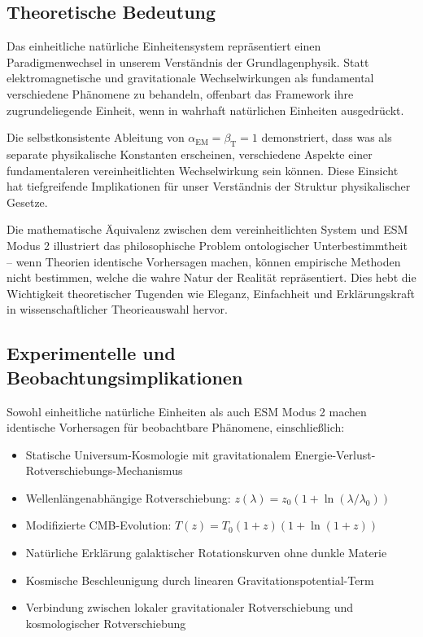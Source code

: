 \documentclass[12pt,a4paper]{article}
\newcommand{\alphaEM}{\alpha_{\text{EM}}}
\newcommand{\betaT}{\beta_{\text{T}}}
\begin{document}
	\subsection{Theoretische Bedeutung}
	\label{subsec:theoretical_significance}
	
	Das einheitliche natürliche Einheitensystem repräsentiert einen Paradigmenwechsel in unserem Verständnis der Grundlagenphysik. Statt elektromagnetische und gravitationale Wechselwirkungen als fundamental verschiedene Phänomene zu behandeln, offenbart das Framework ihre zugrundeliegende Einheit, wenn in wahrhaft natürlichen Einheiten ausgedrückt.
	
	Die selbstkonsistente Ableitung von $\alphaEM = \betaT = 1$ demonstriert, dass was als separate physikalische Konstanten erscheinen, verschiedene Aspekte einer fundamentaleren vereinheitlichten Wechselwirkung sein können. Diese Einsicht hat tiefgreifende Implikationen für unser Verständnis der Struktur physikalischer Gesetze.
	
	Die mathematische Äquivalenz zwischen dem vereinheitlichten System und ESM Modus 2 illustriert das philosophische Problem ontologischer Unterbestimmtheit – wenn Theorien identische Vorhersagen machen, können empirische Methoden nicht bestimmen, welche die wahre Natur der Realität repräsentiert. Dies hebt die Wichtigkeit theoretischer Tugenden wie Eleganz, Einfachheit und Erklärungskraft in wissenschaftlicher Theorieauswahl hervor.
	
	\subsection{Experimentelle und Beobachtungsimplikationen}
	\label{subsec:experimental_implications}
	
	Sowohl einheitliche natürliche Einheiten als auch ESM Modus 2 machen identische Vorhersagen für beobachtbare Phänomene, einschließlich:
	
	\begin{itemize}
		\item Statische Universum-Kosmologie mit gravitationalem Energie-Verlust-Rotverschiebungs-Mechanismus
		\item Wellenlängenabhängige Rotverschiebung: $z(\lambda) = z_0(1 + \ln(\lambda/\lambda_0))$
		\item Modifizierte CMB-Evolution: $T(z) = T_0(1+z)(1+\ln(1+z))$
		\item Natürliche Erklärung galaktischer Rotationskurven ohne dunkle Materie
		\item Kosmische Beschleunigung durch linearen Gravitationspotential-Term
		\item Verbindung zwischen lokaler gravitationaler Rotverschiebung und kosmologischer Rotverschiebung
	\end{itemize}
	
\end{document}
